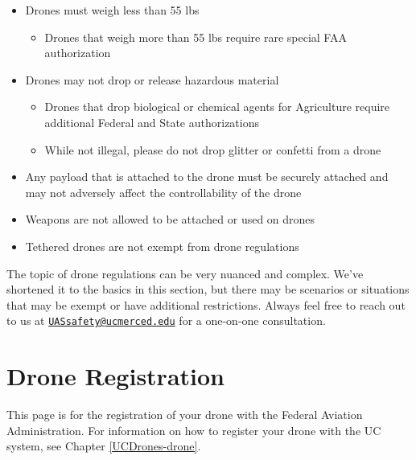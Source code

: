 \documentclass[
  12pt,
]{book}
\providecommand{\tightlist}{%
  \setlength{\itemsep}{0pt}\setlength{\parskip}{0pt}}
\newenvironment{notebox}{
  \definecolor{shadecolor}{gray}{.8}  %
  \color{black}
  \begin{shaded}}
 {\end{shaded}}
\begin{document}
\begin{itemize}
\tightlist
\item
  Drones must weigh less than 55 lbs

  \begin{itemize}
  \tightlist
  \item
    Drones that weigh more than 55 lbs require rare special FAA authorization
  \end{itemize}
\item
  Drones may not drop or release hazardous material

  \begin{itemize}
  \tightlist
  \item
    Drones that drop biological or chemical agents for Agriculture require additional Federal and State authorizations
  \item
    While not illegal, please do not drop glitter or confetti from a drone
  \end{itemize}
\item
  Any payload that is attached to the drone must be securely attached and may not adversely affect the controllability of the drone
\item
  Weapons are not allowed to be attached or used on drones
\item
  Tethered drones are not exempt from drone regulations
\end{itemize}

\begin{notebox}
The topic of drone regulations can be very nuanced and complex. We've shortened it to the basics in this section, but there may be scenarios or situations that may be exempt or have additional restrictions. Always feel free to reach out to us at \href{mailto:UASsafety@ucmerced.edu}{\nolinkurl{UASsafety@ucmerced.edu}} for a one-on-one consultation.

\end{notebox}

\section{Drone Registration}\label{registration}

\begin{notebox}
This page is for the registration of your drone with the Federal Aviation Administration. For information on how to register your drone with the UC system, see Chapter \ref{UCDrones-drone}.

\end{notebox}
\end{document}
